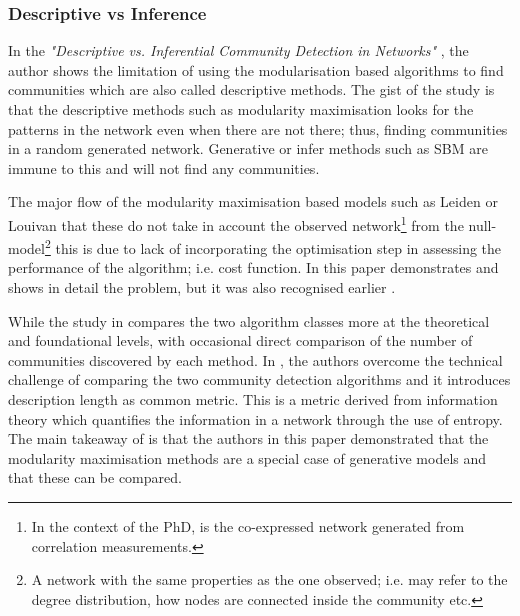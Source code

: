 \subsubsection{Descriptive vs Inference}

In the \textit{"Descriptive vs. Inferential Community Detection in Networks"} \citet{Peixoto2021-jx}, the author shows the limitation of using the modularisation based algorithms to find communities which are also called descriptive methods. The gist of the study is that the descriptive methods such as modularity maximisation looks for the patterns in the network even when there are not there; thus, finding communities in a random generated network. Generative or infer methods such as SBM are immune to this and will not find any communities. 

The major flow of the modularity maximisation based models such as Leiden or Louivan that these do not take in account the observed network\footnote{In the context of the PhD, is the co-expressed network generated from correlation measurements.} from the null-model\footnote{A network with the same properties as the one observed; i.e. may refer to the degree distribution, how nodes are connected inside the community etc.} this is due to lack of incorporating the optimisation step in assessing the performance of the algorithm; i.e. cost function. In this paper \citet{Peixoto2021-jx} demonstrates and shows in detail the problem, but it was also recognised earlier \citet{Guimera2004-gv}.

While the study in \citet{Peixoto2021-jx} compares the two algorithm classes more at the theoretical and foundational levels, with occasional direct comparison of the number of communities discovered by each method. In \citet{Peixoto2023-rt}, the authors overcome the technical challenge of comparing the two community detection algorithms and it introduces description length as common metric. This is a metric derived from information theory which quantifies the information in a network through the use of entropy. The main takeaway of \citet{Peixoto2023-rt} is that the authors in this paper demonstrated that the modularity maximisation methods are a special case of generative models and that these can be compared.


